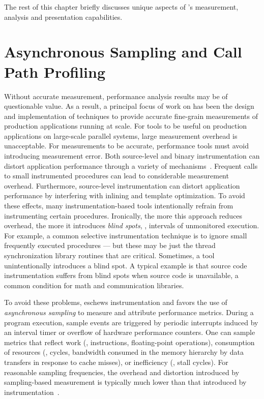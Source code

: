 \documentclass[11pt,twoside,letterpaper]{report}
\begin{document}
The rest of this chapter briefly discusses unique aspects of \HPCToolkit{}'s measurement, analysis and presentation capabilities.


\section{Asynchronous Sampling and Call Path Profiling}

Without accurate measurement, performance analysis results may be of questionable value.
As a result, a principal focus of work on \HPCToolkit{} has been the design and implementation of techniques to provide accurate fine-grain measurements of production applications running at scale.
For tools to be useful on production applications on large-scale parallel systems, large measurement overhead is unacceptable.
For measurements to be accurate, performance tools must avoid introducing measurement error.
Both source-level and binary instrumentation can distort application performance through a variety of mechanisms~\cite{Mytkowicz:2009:PWD:2528521.1508275}.
Frequent calls to small instrumented procedures can lead to considerable measurement overhead.
Furthermore, source-level instrumentation can distort application performance by interfering with inlining and template optimization.
To avoid these effects, many instrumentation-based tools intentionally refrain from instrumenting certain procedures.
Ironically, the more this approach reduces overhead, the more it introduces \emph{blind spots}, \ie{}, intervals of unmonitored execution.
For example, a common selective instrumentation technique is to ignore small frequently executed procedures --- but these may be just the thread synchronization library routines that are critical.
Sometimes, a tool unintentionally introduces a blind spot.
A typical example is that source code instrumentation suffers from blind spots when source code is unavailable, a common condition for math and communication libraries.

To avoid these problems, \HPCToolkit{} eschews instrumentation and favors the use of \emph{asynchronous sampling} to measure and attribute performance metrics.
During a program execution, sample events are triggered by periodic interrupts induced by an interval timer or overflow of hardware performance counters.
One can sample metrics that reflect work (\eg{}, instructions, floating-point operations), consumption of resources (\eg{}, cycles, bandwidth consumed in the memory hierarchy by data transfers in response to cache misses), or inefficiency (\eg{}, stall cycles).
For reasonable sampling frequencies, the overhead and distortion introduced by sampling-based measurement is typically much lower than that introduced by instrumentation~\cite{Froyd-MC-Fo:2005:ICS-csprof}.
\end{document}
